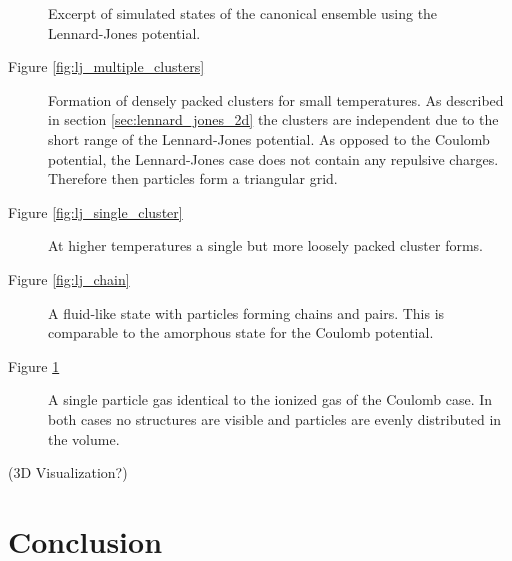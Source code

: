 \documentclass[11pt, a4paper]{article}
\numberwithin{equation}{section}
\newcommand{\remark}[1]{{\color{red}(#1)}}
\begin{document}
\begin{figure}[h]
\begin{subfigure}[t]{0.48\textwidth}
		\label{fig:lj_gas}
		\vspace*{0.3cm}
	\end{subfigure}
	\caption{Excerpt of simulated states of the canonical ensemble using the Lennard-Jones potential.}
	\label{fig:lj_vis}
\end{figure}
\begin{description}
	\item[Figure \ref{fig:lj_multiple_clusters}] 
		Formation of densely packed clusters for small temperatures.
		As described in section \ref{sec:lennard_jones_2d} the clusters are independent due to the short range of the Lennard-Jones potential.
		As opposed to the Coulomb potential, the Lennard-Jones case does not contain any repulsive charges.
		Therefore then particles form a triangular grid.
		
	\item[Figure \ref{fig:lj_single_cluster}]
		At higher temperatures a single but more loosely packed cluster forms.
	
	\item[Figure \ref{fig:lj_chain}]
		A fluid-like state with particles forming chains and pairs.
		This is comparable to the amorphous state for the Coulomb potential.
	
	\item[Figure \ref{fig:lj_gas}] 
		A single particle gas identical to the ionized gas of the Coulomb case.
		In both cases no structures are visible and particles are evenly distributed in the volume.
\end{description}



\remark{3D Visualization?}

\clearpage
\section{Conclusion}
\end{document}
